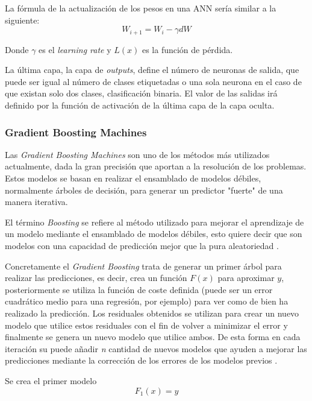 La fórmula de la actualización de los pesos en una ANN sería similar a la siguiente:
\begin{equation}
    W_{i+1} = W_i - \gamma d W
\end{equation}

Donde \(\gamma\) es el \textit{learning rate} y \(L(x)\) es la función de pérdida.

La última capa, la capa de \textit{outputs}, define el número de neuronas de salida, que puede ser igual al número de clases etiquetadas o una sola neurona en el caso de que existan solo dos clases, clasificación binaria. El valor de las salidas irá definido por la función de activación de la última capa de la capa oculta.

\subsubsection{Gradient Boosting Machines}

Las \textit{Gradient Boosting Machines} son uno de los métodos más utilizados actualmente, dada la gran precisión que aportan a la resolución de los problemas. Estos modelos se basan en realizar el ensamblado de modelos débiles, normalmente árboles de decisión, para generar un predictor "fuerte" de una manera iterativa. 

El término \textit{Boosting} se refiere al método utilizado para mejorar el aprendizaje de un modelo mediante el ensamblado de modelos débiles, esto quiere decir que son modelos con una capacidad de predicción mejor que la pura aleatoriedad \cite{freund1996experiments}. 

Concretamente el \textit{Gradient Boosting} trata de generar un primer árbol para realizar las predicciones, es decir, crea un función \(F(x)\) para aproximar \(y\), posteriormente se utiliza la función de coste definida (puede ser un error cuadrático medio para una regresión, por ejemplo) para ver como de bien ha realizado la predicción. Los residuales obtenidos se utilizan para crear un nuevo modelo que utilice estos residuales con el fin de volver a minimizar el error y finalmente se genera un nuevo modelo que utilice ambos. De esta forma en cada iteración su puede añadir \textit{n} cantidad de nuevos modelos que ayuden a mejorar las predicciones mediante la corrección de los errores de los modelos previos \cite{webgbm}.

Se crea el primer modelo
\begin{equation}
    F_1(x) = y
\end{equation}

